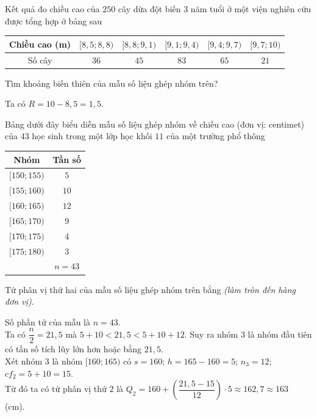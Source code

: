 \begin{bt}%
	Kết quả đo chiều cao của $250$ cây dừa đột biến $3$ năm tuổi ở một viện nghiên cứu được tổng hợp ở bảng sau
	\begin{center}
		\begin{tabular}{|c|c|c|c|c|c|}
			\hline
			Chiều cao (m) & $[8{,}5;8{,}8)$ & $[8{,}8;9{,}1)$ & $[9{,}1;9{,}4)$ & $[9{,}4;9{,}7)$ & $[9{,}7;10)$ \\
			\hline
			Số cây & $36$ & $45$ & $83$ & $65$ & $21$ \\
			\hline
		\end{tabular}	
	\end{center}
	Tìm khoảng biến thiên của mẫu số liệu ghép nhóm trên?
	
	\loigiai
	{
		Ta có $R=10-8{,}5=1{,}5$.
	}
\end{bt}

\begin{bt}%
	Bảng dưới đây biểu diễn mẫu số liệu ghép nhóm về chiều cao (đơn vị: centimet) của $43$ học sinh trong một lớp học khối $11$ của một trường phổ thông 
	\begin{center}
		\begin{tabular}{|c|c|}
			\hline
			Nhóm & Tần số \\
			\hline
			$[150;155)$ & $5$ \\
			\hline
			$[155;160)$ & $10$ \\
			\hline
			$[160;165)$ & $12$ \\
			\hline
			$[165;170)$ & $9$ \\
			\hline
			$[170;175)$ & $4$ \\
			\hline
			$[175;180)$ & $3$ \\
			\hline
			& $n=43$ \\
			\hline
		\end{tabular}
	\end{center}	
	Tứ phân vị thứ hai của mẫu số liệu ghép nhóm trên bằng \textit{(làm tròn đến hàng đơn vị)}.
	
	\loigiai
	{
		Số phần tử của mẫu là $n=43$.\\
		Ta có $\dfrac{n}{2}=21{,}5$ mà $5+10< 21{,}5< 5+10+12$. Suy ra nhóm $3$ là nhóm đầu tiên có tần số tích lũy lớn hơn hoặc bằng $21{,}5$.\\
		Xét nhóm $3$ là nhóm $[160;165)$ có $s=160$; $h=165-160=5$; $n_3=12$; $cf_2=5+10=15$.\\
		Từ đó ta có tứ phân vị thứ $2$ là  $Q_2=160+\left(\dfrac{21{,}5-15}{12} \right)\cdot 5\approx 162{,}7\approx 163$ \,(cm).
	}
\end{bt}


